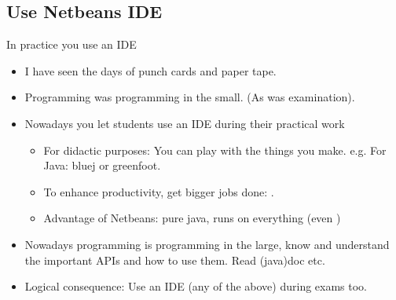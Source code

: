 \subsection[Use an IDE]{Use Netbeans IDE}
\begin{frame}{In practice you use an IDE}
  \begin{itemize}
  \item I have seen the days of punch cards and paper tape.
  \item Programming was programming in the small. (As was examination).
  \item Nowadays you let students use an IDE during their practical work
    \begin{itemize}
    \item For didactic purposes: You can play with the things you
      make. e.g. For Java: bluej or greenfoot.
    \item To enhance productivity, get bigger jobs done: .
    \item Advantage of Netbeans: pure java, runs on everything (even
      )
    \end{itemize}
  \item Nowadays programming is programming in the large, know and
    understand the important APIs and how to use them. Read (java)doc etc.
  \item Logical consequence: Use an IDE (any of the above) during
    exams too.
  \end{itemize}
\end{frame}

